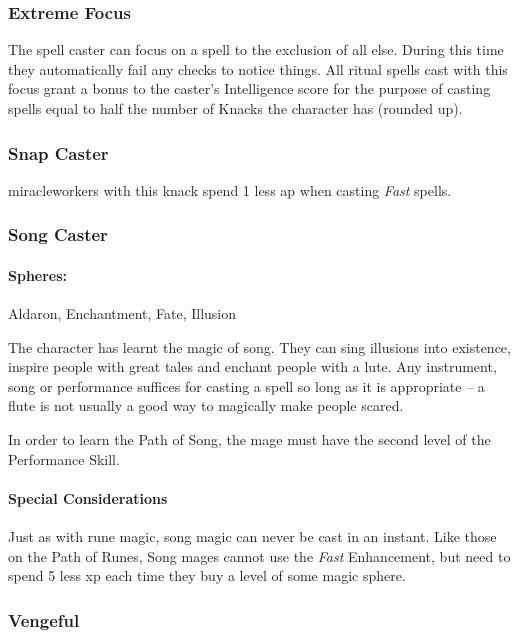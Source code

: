 \begin{multicols}{2}
\subsubsection{Extreme Focus}

The spell caster can focus on a spell to the exclusion of all else.
During this time they automatically fail any checks to notice things.
All ritual spells cast with this focus grant a bonus to the caster's Intelligence score for the purpose of casting spells equal to half the number of Knacks the character has (rounded up).

\subsubsection{Snap Caster}

\iftoggle{verbose}{
  The character is particularly adept at casting spells quickly, and therefore in Combat.
}{}
\Glspl{miracleworker} with this knack spend 1 less \gls{ap} when casting \textit{Fast} spells.

\subsubsection{Song Caster}
\paragraph{Spheres:} Aldaron, Enchantment, Fate, Illusion

The character has learnt the magic of song. They can sing illusions into existence, inspire people with great tales and enchant people with a lute. Any instrument, song or performance suffices for casting a spell so long as it is appropriate -- a flute is not usually a good way to magically make people scared.

In order to learn the Path of Song, the mage must have the second level of the Performance Skill. 

\paragraph{Special Considerations}

Just as with rune magic, song magic can never be cast in an instant.
Like those on the Path of Runes, Song mages cannot use the \textit{Fast} Enhancement, but need to spend 5 less \gls{xp} each time they buy a level of some magic sphere.

\subsubsection{Vengeful}


\end{multicols}
